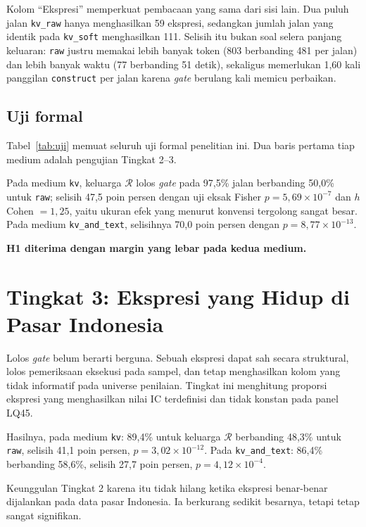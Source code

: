 \documentclass{laporanta1statugm}
\newcommand{\code}[1]{\texttt{#1}}
\begin{document}
Kolom ``Ekspresi'' memperkuat pembacaan yang sama dari sisi lain. Dua puluh
jalan \code{kv\_raw} hanya menghasilkan 59 ekspresi, sedangkan jumlah jalan
yang identik pada \code{kv\_soft} menghasilkan 111. Selisih itu bukan soal
selera panjang keluaran: \code{raw} justru memakai lebih banyak token
(803 berbanding 481 per jalan) dan lebih banyak waktu (77 berbanding 51 detik),
sekaligus memerlukan 1,60 kali panggilan \code{construct} per jalan karena
\textit{gate} berulang kali memicu perbaikan.

\subsection{Uji formal}

Tabel~\ref{tab:uji} memuat seluruh uji formal penelitian ini. Dua baris pertama
tiap medium adalah pengujian Tingkat 2--3.



Pada medium \code{kv}, keluarga $\mathcal{R}$ lolos \textit{gate} pada 97,5\%
jalan berbanding 50,0\% untuk \code{raw}; selisih 47,5 poin persen dengan uji
eksak Fisher $p = 5{,}69\times10^{-7}$ dan $h$ Cohen $= 1{,}25$, yaitu ukuran
efek yang menurut konvensi tergolong sangat besar. Pada medium
\code{kv\_and\_text}, selisihnya 70,0 poin persen dengan
$p = 8{,}77\times10^{-13}$.

\textbf{H1 diterima dengan margin yang lebar pada kedua medium.}

\section{Tingkat 3: Ekspresi yang Hidup di Pasar Indonesia}

Lolos \textit{gate} belum berarti berguna. Sebuah ekspresi dapat sah secara
struktural, lolos pemeriksaan eksekusi pada sampel, dan tetap menghasilkan
kolom yang tidak informatif pada universe penilaian. Tingkat ini menghitung
proporsi ekspresi yang menghasilkan nilai IC terdefinisi dan tidak konstan pada
panel LQ45.

Hasilnya, pada medium \code{kv}: 89,4\% untuk keluarga $\mathcal{R}$ berbanding
48,3\% untuk \code{raw}, selisih 41,1 poin persen,
$p = 3{,}02\times10^{-12}$. Pada \code{kv\_and\_text}: 86,4\% berbanding
58,6\%, selisih 27,7 poin persen, $p = 4{,}12\times10^{-4}$.

Keunggulan Tingkat 2 karena itu tidak hilang ketika ekspresi benar-benar
dijalankan pada data pasar Indonesia. Ia berkurang sedikit besarnya, tetapi
tetap sangat signifikan.
\end{document}
